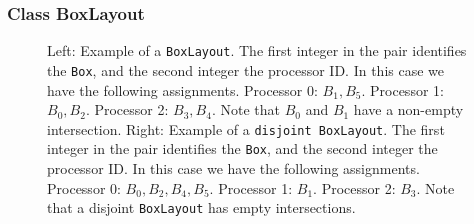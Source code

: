 \subsubsection{Class BoxLayout}
\label{BoxLayoutSection}
\begin{figure}[htp]
\centerline{
\epsfxsize=2.0in
\hspace{1.in} 
\epsfxsize=2.0in
}
\caption{Left:  Example of a {\tt{BoxLayout}}.  The first integer in the pair
identifies the {\tt{Box}}, and the second integer the processor ID.
In this case we have the following assignments.  Processor 0:  $B_1,
B_5$.  Processor 1:  $B_0, B_2$.  Processor 2:  $B_3, B_4$.  Note that
 $B_0$ and $B_1$ have a non-empty intersection.  Right:  Example of a {\tt{disjoint BoxLayout}}.  The first integer in the pair
identifies the {\tt{Box}}, and the second integer the processor ID.
In this case we have the following assignments.  Processor 0:  $B_0,
B_2, B_4, B_5$.  Processor 1:  $B_1$.  Processor 2:  $B_3$. Note that a disjoint {\tt{BoxLayout}} has empty intersections.}  
\label{fig:BoxLayouts}
\end{figure}

